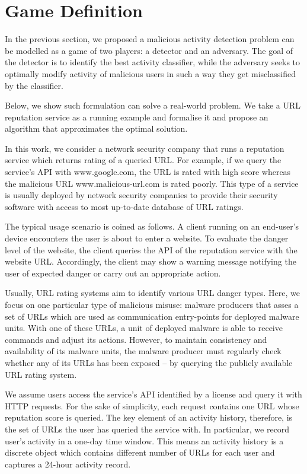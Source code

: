 \section{Game Definition}\label{sec:game_definition}
In the previous section, we proposed a malicious activity detection problem can be modelled as a game of two players: a detector and an adversary. The goal of the detector is to identify the best activity classifier, while the adversary seeks to optimally modify activity of malicious users in such a way they get misclassified by the classifier.

Below, we show such formulation can solve a real-world problem. We take a URL reputation service as a running example and formalise it and propose an algorithm that approximates the optimal solution.

In this work, we consider a network security company that runs a reputation
service which returns rating of a queried URL. For example, if we query the service's API with \textsf{www.google.com}, the URL is rated with high score whereas the malicious URL \textsf{www.malicious-url.com} is rated poorly. This type of a service is usually deployed by network security companies to provide their security software with access to most up-to-date database of URL ratings.

The typical usage scenario is coined as follows. A client running on an
end-user’s device encounters the user is about to enter a website. To
evaluate the danger level of the website, the client queries the API of the reputation service with the website URL. Accordingly, the client may show a warning message notifying the user of expected danger or carry out an
appropriate action.

Usually, URL rating systems aim to identify various URL danger types. Here, we focus on one particular type of malicious misuse: malware producers that asses a set of URLs which are used as communication entry-points for deployed malware
units. With one of these URLs, a unit of deployed malware is able to
receive commands and adjust its actions. However, to maintain
consistency and availability of its malware units, the malware producer
must regularly check whether any of its URLs has been exposed – by
querying the publicly available URL rating system.

We assume users access the service's API identified by a license and query it with HTTP requests. For the sake of simplicity, each request contains one URL whose reputation score is queried. The key element of an activity history, therefore, is the set of URLs the user has queried the service with. In particular, we record user's activity in a one-day time window. This means an activity history is a discrete object which contains different number of URLs for each user and captures a 24-hour activity record.

